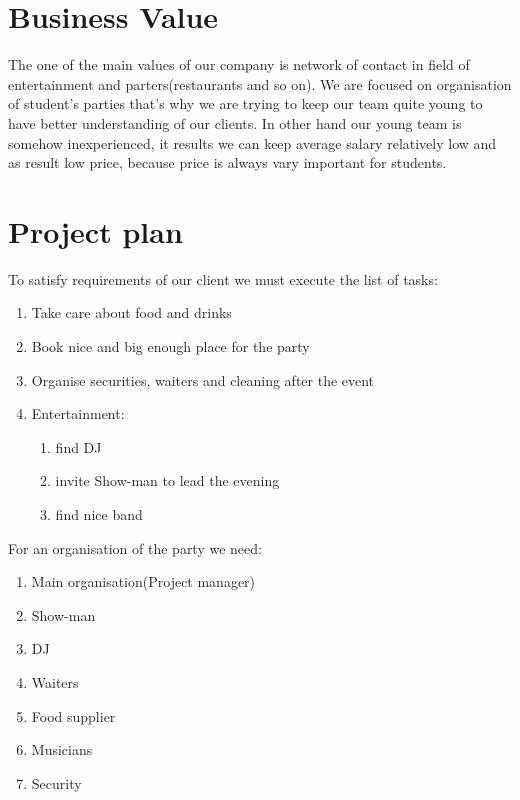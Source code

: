 \documentclass[english]{article}
\begin{document}
\section{Business Value}
The one of the main values of our company is network of contact in field of entertainment and parters(restaurants and so on). We are focused on organisation of student's parties that's why we are trying to keep our team quite young to have better understanding of our clients. In other hand our young team is somehow inexperienced, it results we can keep average salary relatively low and as result low price, because price is always vary important for students.
\section{Project plan} 
To satisfy requirements of our client we must execute the list of tasks:
\begin{enumerate}
\item Take care about food and drinks
\item Book nice and big enough place for the party
\item Organise securities, waiters and cleaning after the event
\item Entertainment:
\begin{enumerate}
\item find DJ
\item invite Show-man to lead the evening
\item find nice band
\end{enumerate}
\end{enumerate}
For an organisation of the party we need:
\begin{enumerate}
\item Main organisation(Project manager)
\item Show-man 
\item DJ
\item Waiters
\item Food supplier
\item Musicians
\item Security
\end{enumerate}
\end{document}
